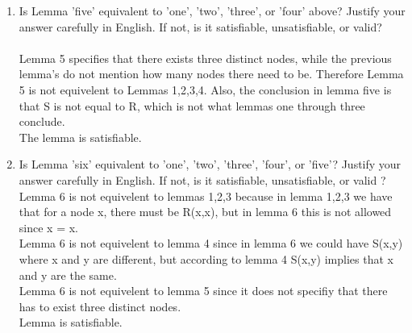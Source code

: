 \documentclass[11pt,leqno,fleqn]{article}
\begin{document}
\begin{enumerate}[(1)]
\item %
Is Lemma 'five' equivalent to 'one', 'two', 'three', or 'four' above? Justify your answer carefully in English. If not, is it satisfiable, unsatisfiable, or valid?\\
\\
Lemma 5 specifies  that there exists three distinct nodes, while the previous lemma's do not mention how many nodes there need to be. Therefore Lemma 5 is not equivelent to Lemmas 1,2,3,4.  Also, the conclusion in lemma five is that S is not equal to R, which is not what lemmas one through three conclude. 
\\
The lemma is satisfiable.

\item  %
Is Lemma 'six' equivalent to 'one', 'two', 'three', 'four', or 'five'? Justify your answer carefully in English. If not, is it satisfiable, unsatisfiable, or valid ?\\
Lemma 6 is not equivelent to lemmas 1,2,3 because in lemma 1,2,3 we have that for a node x, there must  be R(x,x), but in lemma 6 this is not allowed since x = x.\\
Lemma 6 is not equivelent to lemma 4 since in lemma 6 we could have S(x,y) where x and y are different, but according to lemma 4 S(x,y) implies that x and y are the same.\\
Lemma 6 is not equivelent to lemma 5 since it does not specifiy that there has to exist three distinct nodes.\\
Lemma is satisfiable.\\

\end{enumerate}
\end{document}
